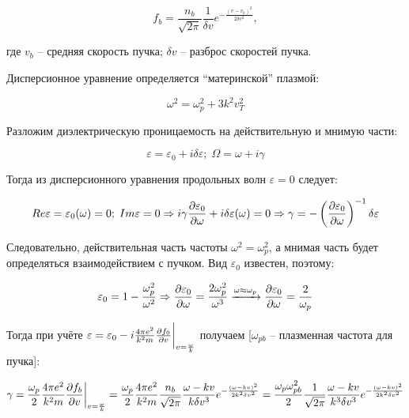 \documentclass[10pt, a4paper]{article}
\begin{document}
\begin{equation*}
	f_b = \frac{n_b}{\sqrt{2\pi}}\frac{1}{\delta v}e^{-\frac{(v-v_b)^2}{2\delta v^2}},
\end{equation*}

где $v_b$ -- средняя скорость пучка; $\delta v$ -- разброс скоростей пучка.

Дисперсионное уравнение определяется ``материнской'' плазмой:

\begin{equation*}
	\omega^2 = \omega_p^2 + 3k^2v_T^2
\end{equation*}

Разложим диэлектрическую проницаемость на действительную и мнимую части:

\begin{equation*}
	\varepsilon = \varepsilon_0 + i\delta\varepsilon;\;\Omega = \omega+i\gamma
\end{equation*}

Тогда из дисперсионного уравнения продольных волн $\varepsilon = 0$ следует:

\begin{equation*}
	Re\varepsilon = \varepsilon_0(\omega) = 0;\;Im\varepsilon = 0 \Rightarrow i\gamma\pdv{\varepsilon_0}{\omega} + i\delta\varepsilon(\omega) = 0 \Rightarrow \gamma = -\left(\pdv{\varepsilon_0}{\omega}\right)^{-1}\delta\varepsilon
\end{equation*}

Следовательно, действительная часть частоты $\omega^2 = \omega_p^2$, а мнимая часть будет определяться взаимодействием с пучком. Вид $\varepsilon_0$ известен, поэтому:

\begin{equation*}
	\varepsilon_0 = 1 - \frac{\omega_p^2}{\omega^2} \Rightarrow \pdv{\varepsilon_0}{\omega} = \frac{2\omega_p^2}{\omega^3} \xrightarrow{\omega\approx\omega_p} \pdv{\varepsilon_0}{\omega} = \frac{2}{\omega_p}
\end{equation*}

Тогда при учёте $\varepsilon = \varepsilon_0 - i\frac{4\pi e^2}{k^2 m}\pdv{f_0}{v}\bigg|_{v=\frac{\omega}{k}}$ получаем [$\omega_{pb}$ -- плазменная частота для пучка]:

\begin{equation*}
	\gamma = \frac{\omega_p}{2}\frac{4\pi e^2}{k^2 m}\pdv{f_b}{v}\bigg|_{v=\frac{\omega}{k}} = \frac{\omega_p}{2}\frac{4\pi e^2}{k^2 m}\frac{n_b}{\sqrt{2\pi}}\frac{\omega-kv}{k\delta v^3}e^{-\frac{(\omega-kv)^2}{2k^2\delta v^2}} = \frac{\omega_p\omega_{pb}^2}{2}\frac{1}{\sqrt{2\pi}}\frac{\omega-kv}{k^3\delta v^3}e^{-\frac{(\omega-kv)^2}{2k^2\delta v^2}}
\end{equation*}
\end{document}
